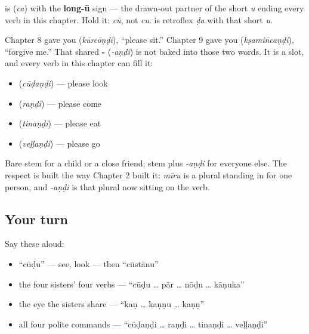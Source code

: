 \begin{sounds}
\textbf{} is \textbf{} (\emph{ca}) with the \textbf{long-ū} sign — the drawn-out partner of the short \emph{u} ending every verb in this chapter. Hold it: \emph{cū}, not \emph{cu}. \textbf{} is retroflex \emph{ḍa} with that short \emph{u}.
\end{sounds}

\begin{grammarlens}[title={Grammar Lens: -\te{అండి}, the respectful command, on any stem}]
Chapter 8 gave you \textbf{} (\emph{kūrcōṇḍi}), \textquotedblleft{}please sit.\textquotedblright{} Chapter 9 gave you \textbf{} (\emph{kṣamin̄caṇḍi}), \textquotedblleft{}forgive me.\textquotedblright{} That shared \textbf{-} (\emph{-aṇḍi}) is not baked into those two words. It is a slot, and every verb in this chapter can fill it:

\begin{itemize}
\raggedright
  \item \textbf{} (\emph{cūḍaṇḍi}) — please look
  \item \textbf{} (\emph{raṇḍi}) — please come
  \item \textbf{} (\emph{tinaṇḍi}) — please eat
  \item \textbf{} (\emph{veḷḷaṇḍi}) — please go
\end{itemize}

Bare stem for a child or a close friend; stem plus \emph{-aṇḍi} for everyone else. The respect is built the way Chapter 2 built it: \emph{mīru} is a plural standing in for one person, and \emph{-aṇḍi} is that plural now sitting on the verb.
\end{grammarlens}

\subsection*{Your turn}
Say these aloud:

\begin{itemize}
\raggedright
  \item \textquotedblleft{}cūḍu\textquotedblright{} — see, look — then \textquotedblleft{}cūstānu\textquotedblright{}
  \item the four sisters' four verbs — \textquotedblleft{}cūḍu … pār … nōḍu … kāṇuka\textquotedblright{}
  \item the eye the sisters share — \textquotedblleft{}kaṇ … kaṇṇu … kaṇṇ\textquotedblright{}
  \item all four polite commands — \textquotedblleft{}cūḍaṇḍi … raṇḍi … tinaṇḍi … veḷḷaṇḍi\textquotedblright{}
\end{itemize}

